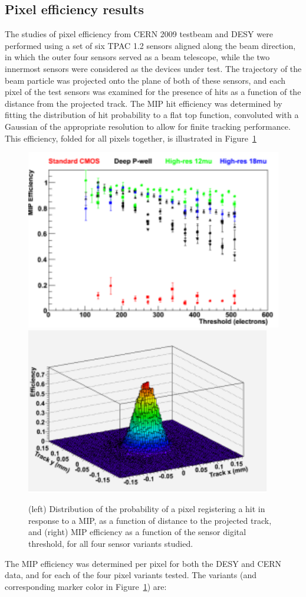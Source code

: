 \subsection{Pixel efficiency results}
The studies of pixel efficiency from CERN 2009 testbeam and DESY were performed using a
set of six TPAC 1.2 sensors aligned along the beam direction, in which the outer four sensors
served as a beam telescope, while the two innermost sensors were considered as the devices
under test. The trajectory of the beam particle was projected onto the plane of both of these
sensors, and each pixel of the test sensors was examined for the presence of hits as a function
of the distance from the projected track. The MIP hit efficiency was determined by fitting
the distribution of hit probability to a flat top function, convoluted with a Gaussian of the
appropriate resolution to allow for finite tracking performance. This efficiency, folded for all
pixels together, is illustrated in Figure~\ref{fig:Calorimeter:DECAL:MIPS}

\begin{figure}
    \includegraphics[width=.49\textwidth]{Calorimeter/DECAL/MIPEfficiency}
    \includegraphics[width=.49\textwidth]{Calorimeter/DECAL/MIPResponse}
    \caption{(left) Distribution of the probability of a pixel registering a hit in response to a MIP, as a function of distance to the projected track, and (right) MIP efficiency as a function of the sensor digital threshold, for all four sensor variants studied.}
    \label{fig:Calorimeter:DECAL:MIPS}
\end{figure}

The MIP efficiency was determined per pixel for both the DESY and CERN data, and for each of the four pixel variants tested. The variants (and corresponding marker color in Figure~\ref{fig:Calorimeter:DECAL:MIPS}) are:

